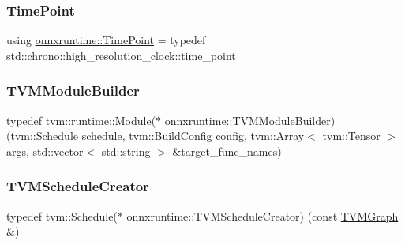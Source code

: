\mbox{\label{namespaceonnxruntime_a9b5a17a572f7c3cf77f4892542bd7153}} 
\subsubsection{\texorpdfstring{Time\+Point}{TimePoint}}
{\footnotesize\ttfamily using \mbox{\hyperlink{namespaceonnxruntime_a9b5a17a572f7c3cf77f4892542bd7153}{onnxruntime\+::\+Time\+Point}} = typedef std\+::chrono\+::high\+\_\+resolution\+\_\+clock\+::time\+\_\+point}

\mbox{\label{namespaceonnxruntime_a8d3c281cff2909b8d6e39a7f548f0275}} 
\subsubsection{\texorpdfstring{T\+V\+M\+Module\+Builder}{TVMModuleBuilder}}
{\footnotesize\ttfamily typedef tvm\+::runtime\+::\+Module($\ast$ onnxruntime\+::\+T\+V\+M\+Module\+Builder) (tvm\+::\+Schedule schedule, tvm\+::\+Build\+Config config, tvm\+::\+Array$<$ tvm\+::\+Tensor $>$ args, std\+::vector$<$ std\+::string $>$ \&target\+\_\+func\+\_\+names)}

\mbox{\label{namespaceonnxruntime_ace55df423d49db239373dbd15308d6a8}} 
\subsubsection{\texorpdfstring{T\+V\+M\+Schedule\+Creator}{TVMScheduleCreator}}
{\footnotesize\ttfamily typedef tvm\+::\+Schedule($\ast$ onnxruntime\+::\+T\+V\+M\+Schedule\+Creator) (const \mbox{\hyperlink{structonnxruntime_1_1TVMGraph}{T\+V\+M\+Graph}} \&)}

\mbox{\label{namespaceonnxruntime_a99e5a794fb266de779627b0dd8136ea1}} 

